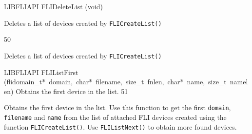 \documentclass{article}
\begin{document}
\begin{cxxfunction}
{LIBFLIAPI}
        {FLIDeleteList}
        {(void)}
        {
 Deletes a list of devices created by \texttt{FLICreateList()}
 
 }
        {50}
\begin{cxxdoc}

Deletes a list of devices created by \texttt{FLICreateList()}


\end{cxxdoc}
\end{cxxfunction}
\begin{cxxfunction}
{LIBFLIAPI}
        {FLIListFirst}
        {(flidomain\_t*\ domain,\ char*\ filename,\ size\_t\ fnlen,\ char*\ name,\ size\_t\ namelen)}
        {
 Obtains the first device in the list.}
        {51}
\begin{cxxdoc}

Obtains the first device in the list. Use this function to
get the first \texttt{domain}, \texttt{filename} and \texttt{name}
from the list of attached FLI devices created using
the function \texttt{FLICreateList()}. Use
\texttt{FLIListNext()} to obtain more found devices.


\end{cxxdoc}
\end{cxxfunction}
\end{document}
